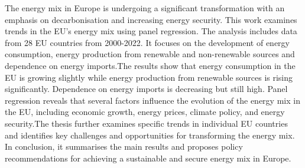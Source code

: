 
\begin{Abstrakt}
    The energy mix in Europe is undergoing a significant transformation with an emphasis on decarbonisation and increasing energy security. This work examines trends in the EU's energy mix using panel regression. The analysis includes data from 28 EU countries from 2000-2022. It focuses on the development of energy consumption, energy production from renewable and non-renewable sources and dependence on energy imports.\newline The results show that energy consumption in the EU is growing slightly while energy production from renewable sources is rising significantly. Dependence on energy imports is decreasing but still high. Panel regression reveals that several factors influence the evolution of the energy mix in the EU, including economic growth, energy prices, climate policy, and energy security.\newline The thesis further examines specific trends in individual EU countries and identifies key challenges and opportunities for transforming the energy mix. In conclusion, it summarises the main results and proposes policy recommendations for achieving a sustainable and secure energy mix in Europe.
\end{Abstrakt}



\clearpage
